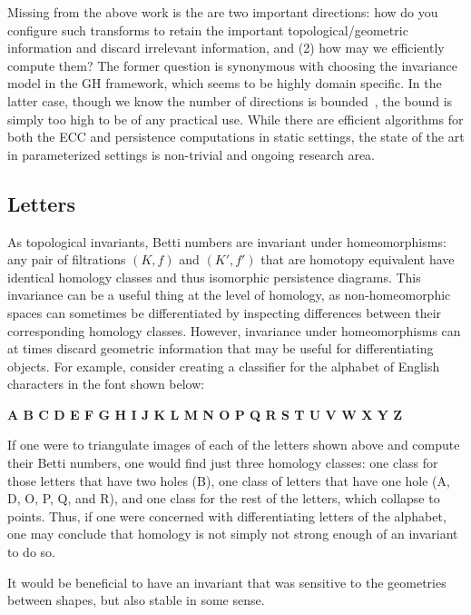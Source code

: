 \documentclass[10pt]{article}
\numberwithin{equation}{section}
\newcommand{\+}{%
	\raisebox{0.18ex}{\scaleobj{0.55}{+}}
}
\theoremstyle{definition}
\theoremstyle{definition}
\begin{document}
 Missing from the above work is the are two important directions: how do you configure such transforms to retain the important topological/geometric information and discard irrelevant information, and (2) how may we efficiently compute them? 
The former question is synonymous with choosing the invariance model in the GH framework, which seems to be highly domain specific. 
 In the latter case, though we know the number of directions is bounded~\cite{}, the bound is simply too high to be of any practical use. While there are efficient algorithms for both the ECC and persistence computations in static settings, the state of the art in parameterized settings is non-trivial and ongoing research area.
 

\subsection*{Letters}
As topological invariants, Betti numbers are invariant under homeomorphisms: any pair of filtrations $(K, f)$ and $(K', f')$ that are homotopy equivalent have identical homology classes and thus isomorphic persistence diagrams. 
This invariance can be a useful thing at the level of homology, as non-homeomorphic spaces can sometimes be differentiated by inspecting differences between their corresponding homology classes. 
However, invariance under homeomorphisms can at times discard geometric information that may be useful for differentiating objects.
For example, consider creating a classifier for the alphabet of English characters in the font shown below:
\vspace{0.5em}
\\
\vspace{0.5em}
\begin{ttfamily}
	\selectfont \bfseries
	\hfill A B C D E F G H I J K L M N O P Q R S T U V W X Y Z \hfill 
\end{ttfamily}

\noindent If one were to triangulate images of each of the letters shown above and compute their Betti numbers, one would find just three homology classes: one class for those letters that have two holes (B), one class of letters that have one hole (A, D, O, P, Q, and R), and one class for the rest of the letters, which collapse to points. Thus, if one were concerned with differentiating letters of the alphabet, one may conclude that homology is not simply not strong enough of an invariant to do so. 

It would be beneficial to have an invariant that was sensitive to the geometries between shapes, but also stable in some sense.
\newpage
\end{document}
